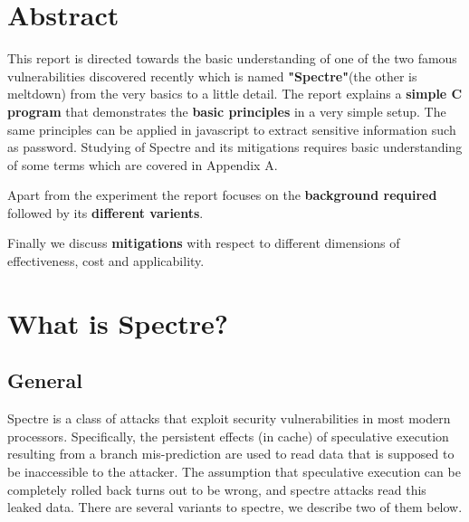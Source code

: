 \documentclass[12pt]{article}
\begin{document}

\tableofcontents
\pagebreak


\section{Abstract}
This report is directed towards the basic understanding of one of the two famous vulnerabilities discovered recently which is named \textbf{"Spectre"}(the other is meltdown) from the very basics to a little detail. The report explains a \textbf{simple C program} that demonstrates the \textbf{basic principles} in a very simple setup. The same principles can be applied in javascript to extract sensitive information such as password. Studying of Spectre and its mitigations requires basic understanding of some terms which are covered in Appendix A.

Apart from the experiment the report focuses on the \textbf{background required} followed by its \textbf{different varients}.

Finally we discuss \textbf{mitigations} with respect to different dimensions of effectiveness, cost and applicability.
%
%
\section{What is Spectre?}
\subsection{General}
Spectre is a class of attacks that exploit security vulnerabilities in most modern processors. Specifically, the persistent effects (in cache) of speculative execution resulting from a branch mis-prediction are used to read data that is supposed to be inaccessible to the attacker. The assumption that speculative execution can be completely rolled back turns out to be wrong, and spectre attacks read this leaked data. There are several variants to spectre, we describe two of them below.
\end{document}
